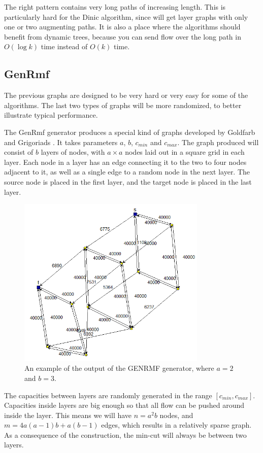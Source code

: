 The right pattern contains very long paths of increasing length. This is particularly hard for the Dinic algorithm, since will get layer graphs with only one or two augmenting paths.
It is also a place where the algorithms should benefit from dynamic trees, because you can send flow over the long path in $O(\log{k})$ time instead of $O(k)$ time.


\subsection{GenRmf}
\label{GENRMFGraphSection}
The previous graphs are designed to be very hard or very easy for some of the algorithms. The last two types of graphs will be more randomized, to better illustrate typical performance.

The GenRmf generator produces a special kind of graphs developed by Goldfarb and Grigoriads \cite{goldfarb1987computational}.
It takes parameters $a$, $b$, $c_{min}$ and $c_{max}$. The graph produced will consist of $b$ layers of nodes, with $a \times a$ nodes laid out in a square grid in each layer.
Each node in a layer has an edge connecting it to the two to four nodes adjacent to it, as well as a single edge to a random node in the next layer.
The source node is placed in the first layer, and the target node is placed in the last layer.

\begin{figure}[!ht]
\centering
\includegraphics[width=90mm]{genrmf.png}
\caption{An example of the output of the GENRMF generator, where $a=2$ and $b=3$.}
\label{genrmfExample}
\end{figure}

The capacities between layers are randomly generated in the range $[c_{min}, c_{max}]$. 
Capacities inside layers are big enough so that all flow can be pushed around inside the layer.
This means we will have $n=a^2b$ nodes, and $m=4a(a-1)b + a(b-1)$ edges, which results in a relatively sparse graph.
As a consequence of the construction, the min-cut will always be between two layers.

